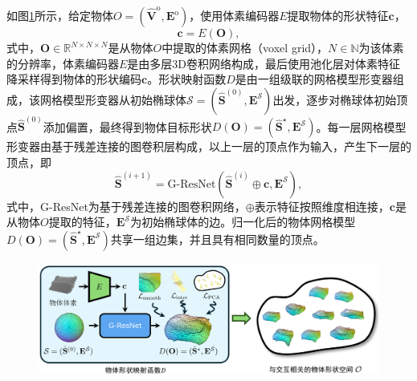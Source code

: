 如图\ref{fig:learn-object-inter-shape}所示，给定物体$O=(\hat{\mathbf{V}}^\text{o}, \mathbf{E}^{\text{o}})$，使用体素编码器$E$提取物体的形状特征$\mathbf{c}$，
\begin{equation}
	\mathbf{c} = E(\mathbf{O}),
\end{equation}
式中，$\mathbf{O}\in \mathbb{R}^{N\times N \times N}$是从物体$O$中提取的体素网格（voxel grid），$N\in \mathbb{N}$为该体素的分辨率，体素编码器$E$是由多层3D卷积网络构成，最后使用池化层对体素特征降采样得到物体的形状编码$\mathbf{c}$。形状映射函数$D$是由一组级联的网格模型形变器组成，该网格模型形变器从初始椭球体$\mathcal{S}=(\hat{\mathbf{S}}^{(0)}, \mathbf{E}^{\mathcal{S}})$出发，逐步对椭球体初始顶点$\hat{\mathbf{S}}^{(0)}$添加偏置，最终得到物体目标形状$D(\mathbf{O})=(\hat{\mathbf{S}}^{\star}, \mathbf{E}^{\mathcal{S}})$。每一层网格模型形变器由基于残差连接的图卷积层构成，以上一层的顶点作为输入，产生下一层的顶点，即
\begin{equation}
	\hat{\mathbf{S}}^{(i+1)} = \text{G-ResNet}(\hat{\mathbf{S}}^{(i)} \oplus \mathbf{c}, \mathbf{E}^{\mathcal{S}}),
\end{equation}
式中，G-ResNet为基于残差连接的图卷积网络\citep{Pixel2Mesh}，$\oplus$表示特征按照维度相连接，$\mathbf{c}$是从物体$O$提取的特征，$\mathbf{E}^{\mathcal{S}}$为初始椭球体的边。归一化后的物体网格模型$D(\mathbf{O})=(\hat{\mathbf{S}}^\star, \mathbf{E}^{\mathcal{S}})$共享一组边集，并且具有相同数量的顶点。

\begin{figure}[!htbp]
	\centering
	\includegraphics{Img/learn_object_shape}
	\label{fig:learn-object-inter-shape}
\end{figure}

